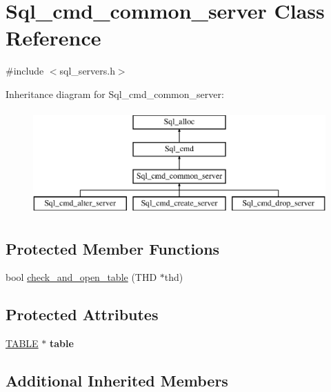 \hypertarget{classSql__cmd__common__server}{}\section{Sql\+\_\+cmd\+\_\+common\+\_\+server Class Reference}
\label{classSql__cmd__common__server}


{\ttfamily \#include $<$sql\+\_\+servers.\+h$>$}

Inheritance diagram for Sql\+\_\+cmd\+\_\+common\+\_\+server\+:\begin{figure}[H]
\begin{center}
\leavevmode
\includegraphics[height=4.000000cm]{classSql__cmd__common__server}
\end{center}
\end{figure}
\subsection*{Protected Member Functions}
\begin{DoxyCompactItemize}
\item 
bool \mbox{\hyperlink{classSql__cmd__common__server_aee2b6c2c62fa898fdc8b630e462df5ef}{check\+\_\+and\+\_\+open\+\_\+table}} (T\+HD $\ast$thd)
\end{DoxyCompactItemize}
\subsection*{Protected Attributes}
\begin{DoxyCompactItemize}
\item 
\mbox{\label{classSql__cmd__common__server_a7d17f6f2519e7638b407e9d5a0af0a67}} 
\mbox{\hyperlink{structTABLE}{T\+A\+B\+LE}} $\ast$ {\bfseries table}
\end{DoxyCompactItemize}
\subsection*{Additional Inherited Members}


